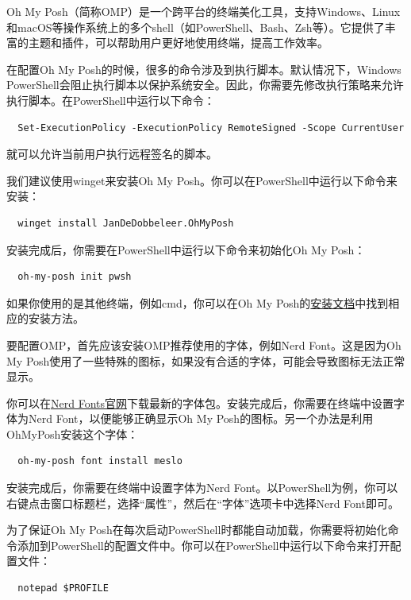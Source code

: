 Oh My Posh（简称OMP）是一个跨平台的终端美化工具，支持Windows、Linux和macOS等操作系统上的多个shell（如PowerShell、Bash、Zsh等）。它提供了丰富的主题和插件，可以帮助用户更好地使用终端，提高工作效率。

\begin{tip}
    在配置Oh My Posh的时候，很多的命令涉及到执行脚本。默认情况下，Windows PowerShell会阻止执行脚本以保护系统安全。因此，你需要先修改执行策略来允许执行脚本。在PowerShell中运行以下命令：
\begin{verbatim}
  Set-ExecutionPolicy -ExecutionPolicy RemoteSigned -Scope CurrentUser
\end{verbatim}
    就可以允许当前用户执行远程签名的脚本。
\end{tip}

我们建议使用winget来安装Oh My Posh。你可以在PowerShell中运行以下命令来安装：

\begin{verbatim}
  winget install JanDeDobbeleer.OhMyPosh
\end{verbatim}

安装完成后，你需要在PowerShell中运行以下命令来初始化Oh My Posh：
\begin{verbatim}
  oh-my-posh init pwsh
\end{verbatim}

如果你使用的是其他终端，例如cmd，你可以在Oh My Posh的\href{https://ohmyposh.dev/docs/installation/prompt}{安装文档}中找到相应的安装方法。

要配置OMP，首先应该安装OMP推荐使用的字体，例如Nerd Font。这是因为Oh My Posh使用了一些特殊的图标，如果没有合适的字体，可能会导致图标无法正常显示。

你可以在\href{https://www.nerdfonts.com/}{Nerd Fonts官网}下载最新的字体包。安装完成后，你需要在终端中设置字体为Nerd Font，以便能够正确显示Oh My Posh的图标。另一个办法是利用OhMyPosh安装这个字体：
\begin{verbatim}
  oh-my-posh font install meslo
\end{verbatim}

安装完成后，你需要在终端中设置字体为Nerd Font。以PowerShell为例，你可以右键点击窗口标题栏，选择“属性”，然后在“字体”选项卡中选择Nerd Font即可。

为了保证Oh My Posh在每次启动PowerShell时都能自动加载，你需要将初始化命令添加到PowerShell的配置文件中。你可以在PowerShell中运行以下命令来打开配置文件：
\begin{verbatim}
  notepad $PROFILE
\end{verbatim}

